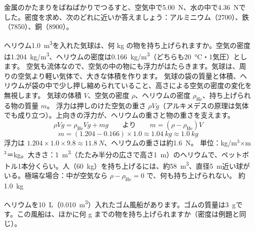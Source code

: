 \begin{jibun}
金属のかたまりをばねばかりでつるすと、空気中で\qty{5.00}{N}、水の中で\qty{4.36}{N}でした。密度を求め、次のどれに近いか答えましょう：アルミニウム（2700）、鉄（7850）、銅（8900）。
\end{jibun}

\begin{phreidai}
\label{ph:力-12:ex12}ヘリウム\qty{1.0}{m^3}を入れた気球は、何 kg の物を持ち上げられますか。空気の密度は\qty{1.204}{kg/m^3}、ヘリウムの密度は\qty{0.166}{kg/m^3}（どちらも\qty{20}{\celsius}・1気圧）とします。
\phbamen
空気も流体なので、空気の中の物にも浮力がはたらきます。気球は、周りの空気より軽い気体で、大きな体積を作ります。
\phmushi
気球の袋の質量と体積、ヘリウムが袋の中で少し押し縮められていること、高さによる空気の密度の変化を無視します。
\phzu
気球の体積 $V$、空気の密度 $\rho$、ヘリウムの密度 $\rho_{\mathrm{He}}$、持ち上げられる物の質量 $m$。
\phriyu
浮力は押しのけた空気の重さ $\rho Vg$（アルキメデスの原理は気体でも成り立つ）。上向きの浮力が、ヘリウムの重さと物の重さを支えます。
\phtateru
\[ \rho Vg=\rho_{\mathrm{He}}Vg+mg\qquad\text{より}\qquad m=(\rho-\rho_{\mathrm{He}})V \]
\phtoku
\[ m=(1.204-0.166)\times1.0\approx\qty{1.04}{kg}\approx\qty{1.0}{kg} \]
浮力は $1.204\times1.0\times9.8\approx\qty{11.8}{N}$、ヘリウムの重さは約\qty{1.6}{N}。
\phtashikame
単位：kg/m$^3$×m$^3$＝kg。大きさ：\qty{1}{m^3}（たたみ半分の広さで高さ\qty{1}{m}）のヘリウムで、ペットボトル1本分くらい。人（\qty{60}{kg}）を持ち上げるには、約\qty{58}{m^3}、直径\qty{5}{m}近い球がいる。極端な場合：中が空気なら $\rho-\rho_{\mathrm{He}}=0$ で、何も持ち上げられない。
\kotae 約\qty{1.0}{kg}
\end{phreidai}
\begin{jibun}
ヘリウムを\qty{10}{L}（\qty{0.010}{m^3}）入れたゴム風船があります。ゴムの質量は\qty{3}{g}です。この風船は、ほかに何 g までの物を持ち上げられますか（密度は例題と同じ）。
\end{jibun}

